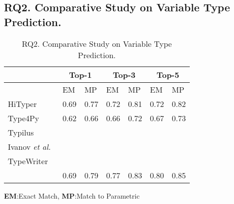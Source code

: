 \subsection{{\bf RQ2. Comparative Study on Variable Type Prediction.}}
\label{empirical-rq2}

\begin{table}[t]
	\caption{RQ2. Comparative Study on Variable Type Prediction.}
	\begin{center}
		\small
		\renewcommand{\arraystretch}{1} \begin{tabular}{p{1.9cm}<{\centering}|p{0.65cm}<{\centering}|p{0.65cm}<{\centering}|p{0.65cm}<{\centering}|p{0.65cm}<{\centering}|p{0.65cm}<{\centering}|p{0.65cm}<{\centering}}
			
			\hline
                       & \multicolumn{2}{c}{Top-1}         & \multicolumn{2}{c}{Top-3}         & \multicolumn{2}{c}{Top-5} \\
			\hline
                       & EM & MP & EM & MP & EM & MP  \\ 
			\hline
			HiTyper~\cite{HiTyper-icse22}  & 0.69 & 0.77 & 0.72 & 0.81 & 0.72 & 0.82 \\
			Type4Py~\cite{Type4Py-icse22}  & 0.62 & 0.66 & 0.66 & 0.72 & 0.67 & 0.73 \\
			Typilus~\cite{typilus-pldi20}  &      &      &      &      &      &      \\
			Ivanov {\em et al.}~\cite{ivanov21predicting} &      &      &      &      &      &      \\
			TypeWriter~\cite{typewriter-fse20}  &      &      &      &      &      &      \\
			\hline
			{\tool}                                & 0.69 & 0.79 & 0.77 & 0.83 & 0.80 & 0.85 \\
			\hline
		\end{tabular}
		\label{RQ2-result}
		{\bf EM}:Exact Match, {\bf MP}:Match to Parametric
	\end{center}
\end{table}

{\color{red}{I found that the hityper and type4py have results on the dataset ManyTypes4PY. Our results are a little bit different from theirs. I think the reason is that we only use 25k+ while they use the full dataset. To make it consistent, I changed the numbers here in the table to the results that they got on the full dataset. But I still keep our results on google slides in case we need them.}}

